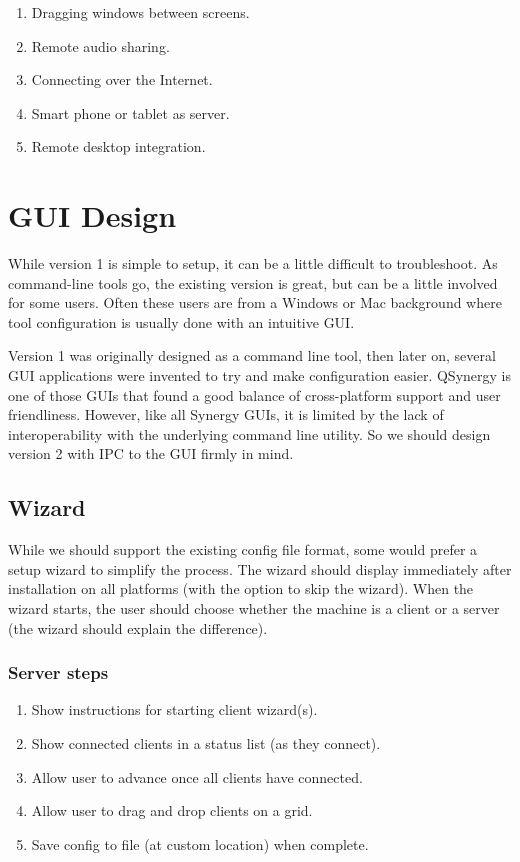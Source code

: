 \documentclass{article}
\begin{document}
\begin{enumerate}
  \item Dragging windows between screens.
  \item Remote audio sharing.
  \item Connecting over the Internet.
  \item Smart phone or tablet as server.
  \item Remote desktop integration.
\end{enumerate}

\section{GUI Design}

While version 1 is simple to setup, it can be a little difficult to
troubleshoot. As command-line tools go, the existing version is great, but
can be a little involved for some users. Often these users are from a Windows
or Mac background where tool configuration is usually done with an intuitive
GUI.

Version 1 was originally designed as a command line tool, then later on, several
GUI applications were invented to try and make configuration easier. QSynergy is
one of those GUIs that found a good balance of cross-platform support and user 
friendliness. However, like all Synergy GUIs, it is limited by the lack of 
interoperability with the underlying command line utility. So we should design 
version 2 with IPC to the GUI firmly in mind.

\subsection{Wizard}

While we should support the existing config file format, some would prefer a
setup wizard to simplify the process. The wizard should display immediately
after installation on all platforms (with the option to skip the wizard). When
the wizard starts, the user should choose whether the machine is a client or a
server (the wizard should explain the difference).

\subsubsection{Server steps}
\begin{enumerate}
  \item Show instructions for starting client wizard(s).
  \item Show connected clients in a status list (as they connect).
  \item Allow user to advance once all clients have connected.
  \item Allow user to drag and drop clients on a grid.
  \item Save config to file (at custom location) when complete.
\end{enumerate}
\end{document}
